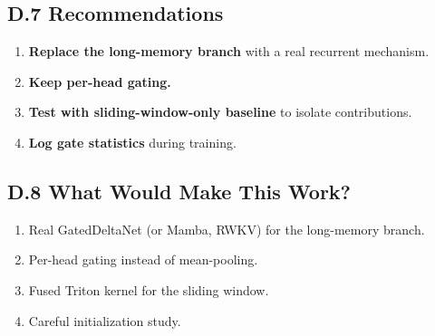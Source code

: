 \subsection{D.7 Recommendations}

\begin{enumerate}
\item \textbf{Replace the long-memory branch} with a real recurrent mechanism.
\item \textbf{Keep per-head gating.}
\item \textbf{Test with sliding-window-only baseline} to isolate contributions.
\item \textbf{Log gate statistics} during training.

\end{enumerate}
\subsection{D.8 What Would Make This Work?}

\begin{enumerate}
\item Real GatedDeltaNet (or Mamba, RWKV) for the long-memory branch.
\item Per-head gating instead of mean-pooling.
\item Fused Triton kernel for the sliding window.
\item Careful initialization study.

\end{enumerate}

